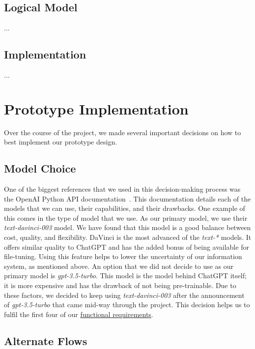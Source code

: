 \documentclass[12pt,a4paper]{article}
\begin{document}
    \subsection{Logical Model}
    ...

    \subsection{Implementation}
    ...

    \section{Prototype Implementation}

    Over the course of the project, we made several important decisions on how to best implement our
    prototype design.

    \subsection{Model Choice}

    One of the biggest references that we used in this decision-making process was
    the OpenAI Python API documentation~\cite{openAiDocs}.  This documentation details
    each of the models that we can use, their capabilities, and their drawbacks.  One example of this
    comes in the type of model that we use.  As our primary model, we use their \textit{text-davinci-003}
    model.  We have found that this model is a good balance between cost, quality, and flexibility.
    DaVinci is the most advanced of the \textit{text-*} models.  It offers similar quality to ChatGPT
    and has the added bonus of being available for file-tuning.  Using this feature helps to lower
    the uncertainty of our information system, as mentioned above.  An option that we did not decide to
    use as our primary model is \textit{gpt-3.5-turbo}.  This model is the model behind ChatGPT itself;
    it is more expensive and has the drawback of not being pre-trainable.  Due to these factors, we
    decided to keep using \textit{text-davinci-003} after the announcement of \textit{gpt-3.5-turbo}
    that came mid-way through the project.  This decision helps us to fulfil the first four of our
    \hyperref[functionalReqs]{functional requirements}.

    \subsection{Alternate Flows}
\end{document}
